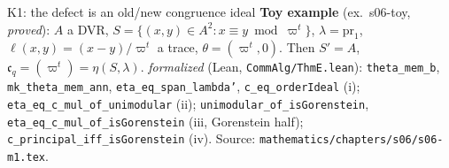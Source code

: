 \begin{frame}{K1: the defect is an old/new congruence ideal}
  \textbf{Toy example} (ex.\ s06-toy, \emph{proved}): $A$ a DVR, $S=\{(x,y)\in A^2:x\equiv y \bmod\varpi^t\}$, $\lambda=\mathrm{pr}_1$, $\ell(x,y)=(x-y)/\varpi^t$ a trace, $\theta=(\varpi^t,0)$. Then $S'=A$, $\mathfrak c_q=(\varpi^t)=\eta(S,\lambda)$.
  \vfill
  {\tiny \emph{formalized} (Lean, \texttt{CommAlg/ThmE.lean}): \texttt{theta\_mem\_b}, \texttt{mk\_theta\_mem\_ann}, \texttt{eta\_eq\_span\_lambda'}, \texttt{c\_eq\_orderIdeal} (i); \texttt{eta\_eq\_c\_mul\_of\_unimodular} (ii); \texttt{unimodular\_of\_isGorenstein}, \texttt{eta\_eq\_c\_mul\_of\_isGorenstein} (iii, Gorenstein half); \texttt{c\_principal\_iff\_isGorenstein} (iv). Source: \texttt{mathematics/chapters/s06/s06-m1.tex}.}
\end{frame}
